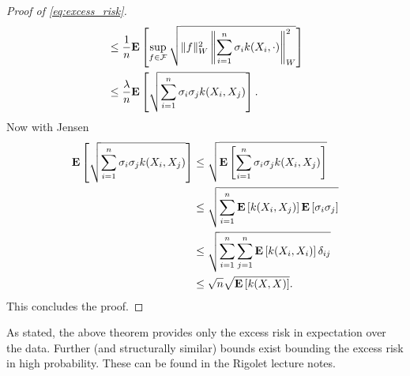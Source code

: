 \begin{proof}[Proof of \autoref{eq:excess_risk}]
\begin{align*}
	& \leq \frac{1}{n} \mathbf{E} \left[\sup_{f \in \mathcal{F}} \sqrt{\|f\|_W^2 \left\|\sum_{i=1}^n \sigma_i k(X_i, \cdot) \right\|_W^2}\right] \\ 
	& \leq \frac{\lambda}{n}\mathbf{E} \left[\sqrt{\sum_{i=1}^n \sigma_i\sigma_j k(X_i, X_j)}\right].
\end{align*}
Now with Jensen
\begin{align*}
	\mathbf{E} \left[\sqrt{\sum_{i=1}^n \sigma_i\sigma_j k(X_i, X_j)}\right] &\leq  \sqrt{\mathbf{E} \left[\sum_{i=1}^n \sigma_i\sigma_j k(X_i, X_j)\right]} \\ 
	&\leq  \sqrt{\sum_{i=1}^n \mathbf{E}\left[k(X_i, X_j)\right] \mathbf{E} \left[\sigma_i\sigma_j \right]} \\ 
	&\leq  \sqrt{\sum_{i=1}^n\sum_{j=1}^n\mathbf{E}\left[k(X_i, X_i)\right] \delta_{ij}} \\
	&\leq \sqrt{n}\sqrt{\mathbf{E}\left[k(X, X)\right]}.
\end{align*}
This concludes the proof.
\end{proof}
As stated, the above theorem provides only the excess risk in expectation over the data. Further (and structurally similar) bounds exist bounding the excess risk in high probability. These can be found in the Rigolet lecture notes.
